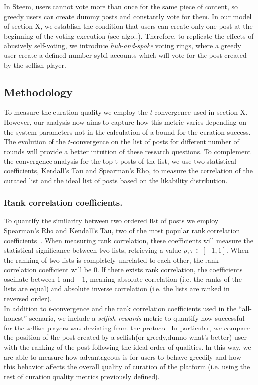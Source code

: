  In Steem, users cannot vote more than once for the same piece of content, so greedy users can create dummy posts and constantly vote for them.
In our model of section X, we establish the condition that users can create only one post at the beginning of the voting execution (see algo..).
 Therefore, to replicate the effects of abusively self-voting, we introduce \textit{hub-and-spoke} voting rings, where a greedy user create a defined number sybil accounts which will vote for the post created by the selfish player.


\subsection{Methodology}

To measure the curation quality we employ the $t$-convergence used in section X. However, our analysis now aims to capture how this metric varies depending on the system parameters not in the calculation of a bound for the curation success.
The evolution of the $t$-convergence on the list of posts for different number of rounds will provide a better intuition of these research questions.
To complement the convergence analysis for the top-t posts of the list, we use two statistical coefficients, Kendall's Tau and Spearman's Rho, to measure the correlation of the curated list and the ideal list of posts based on the likability distribution.

\subsubsection*{Rank correlation coefficients.}

To quantify the similarity between two ordered list of posts we employ Spearman's Rho and Kendall's Tau, two of the most popular rank correlation coefficients~\cite{kendall1955rank}.
When measuring rank correlation, these coefficients will measure the statistical significance between two lists, retrieving a value $\rho,\tau \in [-1 , 1]$. 
When the ranking of two lists is completely unrelated to each other, the rank correlation coefficient will be $0$. 
If there exists rank correlation, the coefficients oscillate between $1$ and $-1$, meaning absolute correlation (i.e. the ranks of the lists are equal) and absolute inverse correlation (i.e. the lists are ranked in reversed order).\\

In addition to $t$-convergence and the rank correlation coefficients used in the ``all-honest'' scenario, we include a \textit{selfish-rewards} metric to quantify how successful for the selfish players was deviating from the protocol. 
In particular, we compare the position of the post created by a selfish(or greedy,dunno what's better) user with the ranking of the post following the ideal order of qualities. In this way, we are able to measure how advantageous is for users to behave greedily and how this behavior affects the overall quality of curation of the platform (i.e. using the rest of curation quality metrics previously defined).


